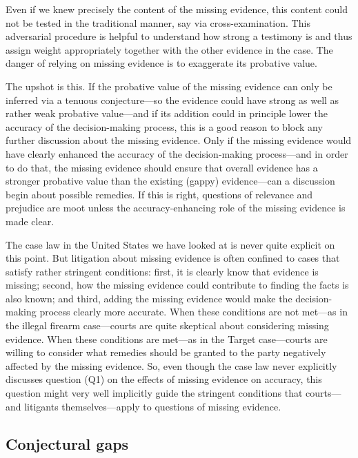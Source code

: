 \documentclass[
  10pt,
  dvipsnames,enabledeprecatedfontcommands]{scrartcl}
\begin{document}
\noindent Even if we knew precisely the content of the missing evidence,
this content could not be tested in the traditional manner, say via
cross-examination. This adversarial procedure is helpful to understand
how strong a testimony is and thus assign weight appropriately together
with the other evidence in the case. The danger of relying on missing
evidence is to exaggerate its probative value.

The upshot is this. If the probative value of the missing evidence can
only be inferred via a tenuous conjecture---so the evidence could have
strong as well as rather weak probative value---and if its addition
could in principle lower the accuracy of the decision-making process,
this is a good reason to block any further discussion about the missing
evidence. Only if the missing evidence would have clearly enhanced the
accuracy of the decision-making process---and in order to do that, the
missing evidence should ensure that overall evidence has a stronger
probative value than the existing (gappy) evidence---can a discussion
begin about possible remedies. If this is right, questions of relevance
and prejudice are moot unless the accuracy-enhancing role of the missing
evidence is made clear.

The case law in the United States we have looked at is never quite
explicit on this point. But litigation about missing evidence is often
confined to cases that satisfy rather stringent conditions: first, it is
clearly know that evidence is missing; second, how the missing evidence
could contribute to finding the facts is also known; and third, adding
the missing evidence would make the decision-making process clearly more
accurate. When these conditions are not met---as in the illegal firearm
case---courts are quite skeptical about considering missing evidence.
When these conditions are met---as in the Target case---courts are
willing to consider what remedies should be granted to the party
negatively affected by the missing evidence. So, even though the case
law never explicitly discusses question (Q1) on the effects of missing
evidence on accuracy, this question might very well implicitly guide the
stringent conditions that courts---and litigants themselves---apply to
questions of missing evidence.

\hypertarget{conjectural-gaps}{%
\subsection{Conjectural gaps}\label{conjectural-gaps}}
\end{document}
